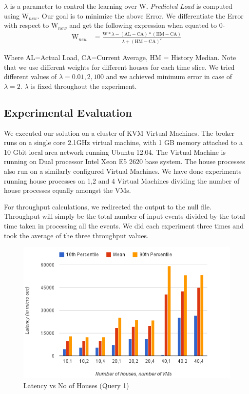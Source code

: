 \noindent $\lambda$ is a parameter to control the learning over W.
\textit{Predicted Load} is computed using $\mbox{W}_{new}$.
Our goal is to minimize the above Error.
We differentiate the Error with respect to $\mbox{W}_{new}$ and get the following expression when equated to 0-
\begin{align*}
\mbox{W}_{new} &= \frac{\mbox{W}*\lambda-(\mbox{AL}-\mbox{CA}) * (\mbox{HM}-\mbox{CA})}{\lambda + (\mbox{HM}-\mbox{CA})^2}
\end{align*}

\noindent Where AL=Actual Load, CA=Current Average, HM = History Median.
Note that we use different weights for different houses for each time slice.
We tried different values of $\lambda=0.01, 2, 100$ and we achieved minimum error in case of $\lambda = 2$.
$\lambda$ is fixed throughout the experiment.

\subsection{Experimental Evaluation}
We executed our solution on a cluster of KVM \cite{kvm}  Virtual Machines.
The broker runs on a single core 2.1GHz virtual machine, with 1 GB memory attached to a 10 Gbit local area network running Ubuntu 12.04.
The Virtual Machine is running on Dual processor Intel Xeon E5 2620 base system.
The house processes also run on a similarly configured Virtual Machines.
We have done experiments running house processes on 1,2 and 4 Virtual Machines dividing the number of house processes equally amongst the VMs.

For throughput calculations, we redirected the output to the null file.
Throughput will simply be the total number of input events divided by the total time taken in processing all the events.
We did each experiment three times and took the average of the three throughput values.
\begin{figure}[h]
\begin{center}
	\includegraphics[scale=0.6]{img/q1_latency}
	\vspace*{-0.4cm}
	\caption{Latency vs No of Houses (Query 1) \label{fig:q1_latency}}
\end{center}
\end{figure}


